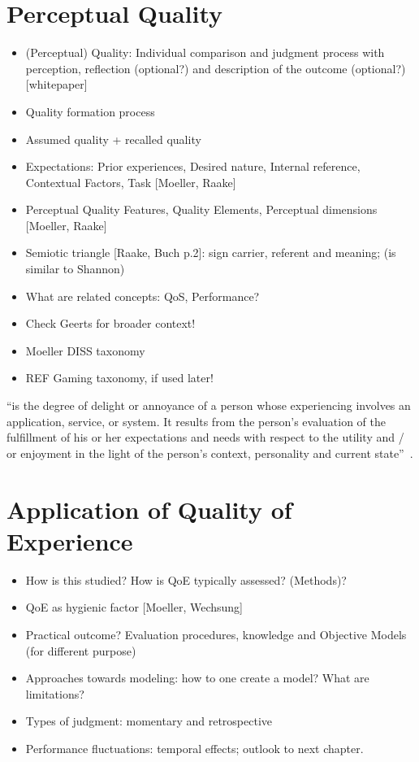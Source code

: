 \section{Perceptual Quality}
\begin{itemize}
\item (Perceptual) Quality: Individual comparison and judgment process with perception, reflection (optional?) and description of the outcome (optional?) [whitepaper]
\item Quality formation process
\item Assumed quality + recalled quality
\item Expectations: Prior experiences, Desired nature, Internal reference, Contextual Factors, Task [Moeller, Raake]
\item Perceptual Quality Features, Quality Elements, Perceptual dimensions [Moeller, Raake]
\item Semiotic triangle [Raake, Buch p.2]: sign carrier, referent and meaning; (is similar to Shannon)
\item What are related concepts: QoS, Performance?

\item Check Geerts for broader context!
\item Moeller DISS taxonomy
\item REF Gaming taxonomy, if used later!
\end{itemize}

\begin{definition}
``is the degree of delight or annoyance of a person whose experiencing involves an application, service, or system. It results from the person’s evaluation of the fulfillment of his or her expectations and needs with respect to the utility and / or enjoyment in the light of the person’s context, personality and current state''~\citep{moller_quality_2014}.
\end{definition}

\section{Application of Quality of Experience}
\begin{itemize}
\item How is this studied? How is QoE typically assessed? (Methods)? 
\item QoE as hygienic factor [Moeller, Wechsung]  
\item Practical outcome? Evaluation procedures, knowledge and Objective Models (for different purpose)

\item Approaches towards modeling: how to one create a model? What are limitations?
\item Types of judgment: momentary and retrospective
\item Performance fluctuations: temporal effects; outlook to next chapter.
\end{itemize}

